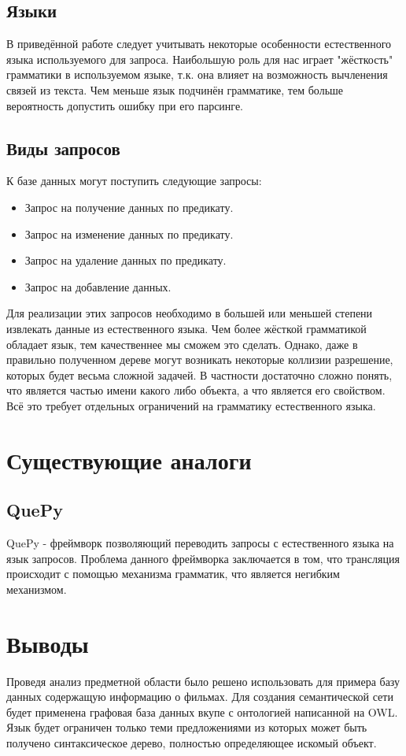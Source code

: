 \subsection{Языки}
В приведённой работе следует учитывать некоторые особенности естественного языка используемого для запроса. Наибольшую роль для нас играет "жёсткость" грамматики в используемом языке, т.к. она влияет на возможность вычленения связей из текста. Чем меньше язык подчинён грамматике, тем больше вероятность допустить ошибку при его парсинге.
\subsection{Виды запросов}
К базе данных могут поступить следующие запросы:
\begin{itemize}
\item Запрос на получение данных по предикату.
\item Запрос на изменение данных по предикату.
\item Запрос на удаление данных по предикату.
\item Запрос на добавление данных.
\end{itemize}
Для реализации этих запросов необходимо в большей или меньшей степени извлекать данные из естественного языка. Чем более жёсткой грамматикой обладает язык, тем качественнее мы сможем это сделать. Однако, даже в правильно полученном дереве могут возникать некоторые коллизии разрешение, которых будет весьма сложной задачей. В частности достаточно сложно понять, что является частью имени какого либо объекта, а что является его свойством.
Всё это требует отдельных ограничений на грамматику естественного языка.

\section{Существующие аналоги}
\subsection{QuePy}
QuePy - фреймворк позволяющий переводить запросы с естественного языка на язык запросов. Проблема данного фреймворка заключается в том, что трансляция происходит с помощью механизма грамматик, что является негибким механизмом.
\section{Выводы}
Проведя анализ предметной области было решено использовать для примера базу данных содержащую информацию о фильмах. Для создания семантической сети будет применена графовая база данных вкупе с онтологией написанной на OWL. Язык будет ограничен только теми предложениями из которых может быть получено синтаксическое дерево, полностью определяющее искомый объект.
